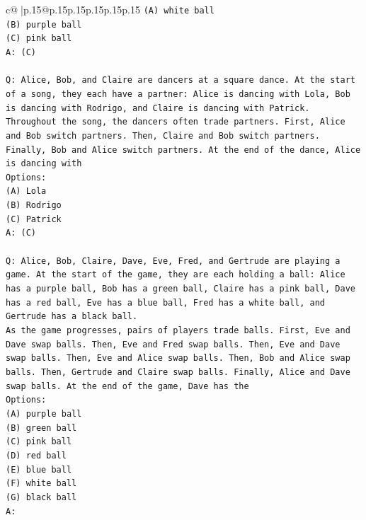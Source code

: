 \documentclass{article}
\begin{document}
{\begin{supertabular}{c@{$\;$}|p{.15\linewidth}@{}p{.15\linewidth}p{.15\linewidth}p{.15\linewidth}p{.15\linewidth}p{.15\linewidth}}
{{{\texttt{(A) white ball} \\
\texttt{(B) purple ball} \\
\texttt{(C) pink ball} \\
\texttt{A: (C)} \\
\\ 
\texttt{Q: Alice, Bob, and Claire are dancers at a square dance. At the start of a song, they each have a partner: Alice is dancing with Lola, Bob is dancing with Rodrigo, and Claire is dancing with Patrick.} \\
\texttt{Throughout the song, the dancers often trade partners. First, Alice and Bob switch partners. Then, Claire and Bob switch partners. Finally, Bob and Alice switch partners. At the end of the dance, Alice is dancing with} \\
\texttt{Options:} \\
\texttt{(A) Lola} \\
\texttt{(B) Rodrigo} \\
\texttt{(C) Patrick} \\
\texttt{A: (C)} \\
\\ 
\texttt{Q: Alice, Bob, Claire, Dave, Eve, Fred, and Gertrude are playing a game. At the start of the game, they are each holding a ball: Alice has a purple ball, Bob has a green ball, Claire has a pink ball, Dave has a red ball, Eve has a blue ball, Fred has a white ball, and Gertrude has a black ball.} \\
\texttt{As the game progresses, pairs of players trade balls. First, Eve and Dave swap balls. Then, Eve and Fred swap balls. Then, Eve and Dave swap balls. Then, Eve and Alice swap balls. Then, Bob and Alice swap balls. Then, Gertrude and Claire swap balls. Finally, Alice and Dave swap balls. At the end of the game, Dave has the} \\
\texttt{Options:} \\
\texttt{(A) purple ball} \\
\texttt{(B) green ball} \\
\texttt{(C) pink ball} \\
\texttt{(D) red ball} \\
\texttt{(E) blue ball} \\
\texttt{(F) white ball} \\
\texttt{(G) black ball} \\
\texttt{A:} \\
            }
        }
    }
     \\ \\


\end{supertabular}}
\end{document}
